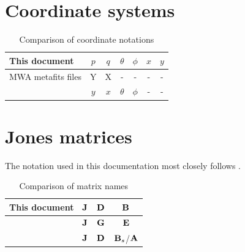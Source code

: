 \documentclass{book}
\begin{document}
\section{Coordinate systems}

\begin{table}[!hb]
    \centering
    \caption{Comparison of coordinate notations}
    \label{tbl:notations}
    \begin{tabular}{l|cc|cc|cc}
        This document & $p$ & $q$ & $\theta$ & $\phi$ & $x$ & $y$ \\
        \hline
        MWA metafits files       & Y & X & - & - & - & - \\
        \citet{Sokolowski2017} & $y$ & $x$ & $\theta$ & $\phi$ & - & - \\
    \end{tabular}
\end{table}

\section{Jones matrices}
\label{sec:jones_matrices}

The notation used in this documentation most closely follows \citet{Ord2019}.

\begin{table}[!hb]
    \centering
    \caption{Comparison of matrix names}
    \label{tbl:notations}
    \begin{tabular}{l|ccc}
        This document & ${\bf J}$ & ${\bf D}$ & ${\bf B}$ \\
        \hline
        \citet{Sokolowski2017} & ${\bf J}$ & ${\bf G}$ & ${\bf E}$ \\
        \citet{Ord2019} & ${\bf J}$ & ${\bf D}$ & ${\bf B}_s$/${\bf A}$ \\
    \end{tabular}
\end{table}

\printindex


\end{document}
